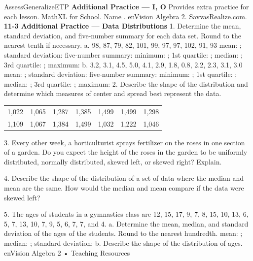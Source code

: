 \documentclass{article}
\newenvironment{te-addendum}[2]{}{}     %
\newcommand{\answer}[1]{}               %
\begin{document}
\begin{te-addendum}{Assess}{GeneralizeETP}
\textbf{Additional Practice — I, O}
Provides extra practice for each lesson.
MathXL for School. Name \underline{\hspace{2cm}}. enVision Algebra 2. SavvasRealize.com.
\textbf{11-3 Additional Practice — Data Distributions}
1. Determine the mean, standard deviation, and five-number summary for each data set. Round to the nearest tenth if necessary.
a. 98, 87, 79, 82, 101, 99, 97, 97, 102, 91, 93
mean: \answer{93.3}; standard deviation: \answer{7.3}
five-number summary: minimum: \answer{79}; 1st quartile: \answer{87}; median: \answer{97}; 3rd quartile: \answer{99}; maximum: \answer{102}
b. 3.2, 3.1, 4.5, 5.0, 4.1, 2.9, 1.8, 0.8, 2.2, 2.3, 3.1, 3.0
mean: \answer{3}; standard deviation: \answer{1.1}
five-number summary: minimum: \answer{0.8}; 1st quartile: \answer{2.3}; median: \answer{3.1}; 3rd quartile: \answer{3.7}; maximum: \answer{5.0}
2. Describe the shape of the distribution and determine which measures of center and spread best represent the data.
\begin{tabular}{rrrrrrr}
1,022 & 1,065 & 1,287 & 1,385 & 1,499 & 1,499 & 1,298 \\
1,109 & 1,067 & 1,384 & 1,499 & 1,032 & 1,222 & 1,046 \\
\end{tabular}
\answer{skewed left; median; interquartile range}
3. Every other week, a horticulturist sprays fertilizer on the roses in one section of a garden. Do you expect the height of the roses in the garden to be uniformly distributed, normally distributed, skewed left, or skewed right? Explain.
\answer{skewed left; She sprays only some of the roses. You might expect the sprayed roses to grow more.}
4. Describe the shape of the distribution of a set of data where the median and mean are the same. How would the median and mean compare if the data were skewed left?
\answer{Symmetrical distribution; the mean would be less than the median.}
5. The ages of students in a gymnastics class are 12, 15, 17, 9, 7, 8, 15, 10, 13, 6, 5, 7, 13, 10, 7, 9, 5, 6, 7, 7, and 4.
a. Determine the mean, median, and standard deviation of the ages of the students. Round to the nearest hundredth.
mean: \answer{9.14}; median: \answer{8}; standard deviation: \answer{3.62}
b. Describe the shape of the distribution of ages. \answer{skewed right}
enVision Algebra 2 • Teaching Resources
\end{te-addendum}
\end{document}
